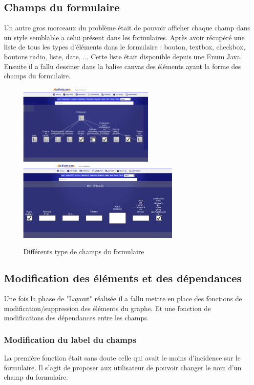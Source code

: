 \subsection{Champs du formulaire}
Un autre gros morceaux du problème était de pouvoir afficher chaque champ dans un style semblable a celui présent dans les formulaires. Après avoir récupéré une liste de tous les types d'éléments dans le formulaire : bouton, textbox, checkbox, boutons radio, liste, date, ... Cette liste était disponible depuis une Enum Java. Ensuite il a fallu dessiner dans la balise canvas des éléments ayant la forme des champs du formulaire.
\vspace{0.5in}
\begin{figure}[!h]
\centering
\includegraphics[height=4cm]{outil/layout-field.png}
\includegraphics[height=4cm]{outil/layout-field-2.png}
\caption{Différents type de champs du formulaire}
\end{figure}

\clearpage
\subsection{Modification des éléments et des dépendances}
Une fois la phase de "Layout" réalisée il a fallu mettre en place des fonctions de modification/suppression des éléments du graphe. Et une fonction de modifications des dépendances entre les champs.

\subsubsection{Modification du label du champs}
La première fonction était sans doute celle qui avait le moins d’incidence sur le formulaire. Il s'agit de proposer aux utilisateur de pouvoir changer le nom d'un champ du formulaire.

